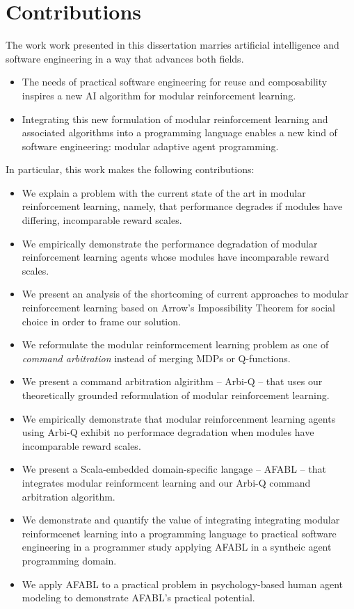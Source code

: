 \section{Contributions}

The work work presented in this dissertation marries artificial intelligence and software engineering in a way that advances both fields.

\begin{itemize}
\item The needs of practical software engineering for reuse and composability inspires a new AI algorithm for modular reinforcement learning.
\item Integrating this new formulation of modular reinforcement learning and associated algorithms into a programming language enables a new kind of software engineering: modular adaptive agent programming.
\end{itemize}

In particular, this work makes the following contributions:

\begin{itemize}
\item We explain a problem with the current state of the art in modular reinforcement learning, namely, that performance degrades if modules have differing, incomparable reward scales.
\item We empirically demonstrate the performance degradation of modular reinforcement learning agents whose modules have incomparable reward scales.
\item We present an analysis of the shortcoming of current approaches to modular reinforcement learning based on Arrow's Impossibility Theorem for social choice in order to frame our solution.
\item We reformulate the modular reinformcement learning problem as one of {\it command arbitration} instead of merging MDPs or Q-functions.
\item We present a command arbitration algirithm -- Arbi-Q -- that uses our theoretically grounded reformulation of modular reinforcement learning.
\item We empirically demonstrate that modular reinforcenment learning agents using Arbi-Q exhibit no performace degradation when modules have incomparable reward scales.
\item We present a Scala-embedded domain-specific langage -- AFABL -- that integrates modular reinformcent learning and our Arbi-Q command arbitration algorithm.
\item We demonstrate and quantify the value of integrating integrating modular reinformcenet learning into a programming language to practical software engineering in a programmer study applying AFABL in a syntheic agent programming domain.
\item We apply AFABL to a practical problem in psychology-based human agent modeling to demonstrate AFABL's practical potential.
\end{itemize}

